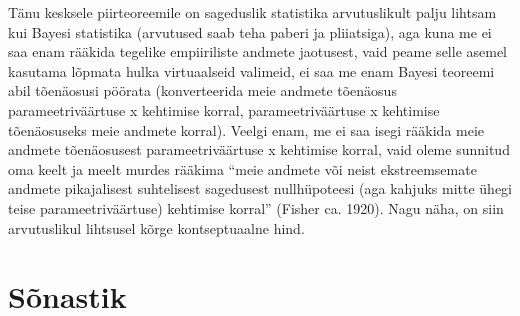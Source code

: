 \documentclass[]{book}
\begin{document}
Tänu kesksele piirteoreemile on sageduslik statistika arvutuslikult
palju lihtsam kui Bayesi statistika (arvutused saab teha paberi ja
pliiatsiga), aga kuna me ei saa enam rääkida tegelike empiiriliste
andmete jaotusest, vaid peame selle asemel kasutama lõpmata hulka
virtuaalseid valimeid, ei saa me enam Bayesi teoreemi abil tõenäosusi
pöörata (konverteerida meie andmete tõenäosus parameetriväärtuse x
kehtimise korral, parameetriväärtuse x kehtimise tõenäosuseks meie
andmete korral). Veelgi enam, me ei saa isegi rääkida meie andmete
tõenäosusest parameetriväärtuse x kehtimise korral, vaid oleme sunnitud
oma keelt ja meelt murdes rääkima ``meie andmete või neist
ekstreemsemate andmete pikajalisest suhtelisest sagedusest nullhüpoteesi
(aga kahjuks mitte ühegi teise parameetriväärtuse) kehtimise korral''
(Fisher ca. 1920). Nagu näha, on siin arvutuslikul lihtsusel kõrge
kontseptuaalne hind.

\chapter{Sõnastik}\label{sonastik}
\end{document}
